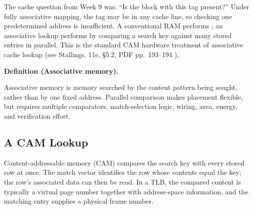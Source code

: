 \documentclass[11pt]{article}
\newenvironment{definitionbox}[1]{%
  \par\noindent\textbf{Definition (#1).}\ \itshape
}{\par\vspace{0.3em}}
\begin{document}
The cache question from Week 9 was: ``Is the block with this tag present?''
Under fully associative mapping, the tag may be in any cache line, so checking
one predetermined address is insufficient. A conventional RAM performs
; an associative lookup performs
 by comparing a search key against
many stored entries in parallel. This is the standard CAM hardware treatment
of associative cache lookup (see Stallings, 11e, \S5.2, PDF pp.~193--194
\cite[\S5.2, PDF pp.~193--194]{Stallings2015_computer_organization}).

\begin{definitionbox}{Associative memory}
Associative memory is memory searched by the content pattern being sought,
rather than by one fixed address. Parallel comparison makes placement
flexible, but requires multiple comparators, match-selection logic, wiring,
area, energy, and verification effort.
\end{definitionbox}

\subsection{A CAM Lookup}

Content-addressable memory (CAM) compares the search key with every stored row
at once. The match vector identifies the row whose contents equal the key;
the row's associated data can then be read. In a TLB, the compared content is
typically a virtual page number together with address-space information, and
the matching entry supplies a physical frame number.
\end{document}
